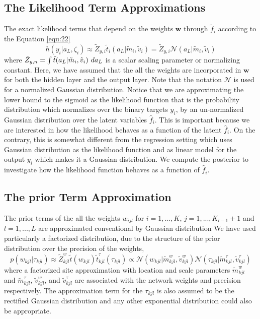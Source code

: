 \documentclass[]{article}
\begin{document}
\subsection*{The Likelihood Term Approximations}
The exact likelihood terms that depend on the weights $\mathbf{w}$ through $\tilde{f}_i$ according to the Equation \ref{equ:22}
\begin{equation}
	h(y_i|a_L,\zeta_i)\approx \tilde{Z}_{y,i} \tilde{t}_i(a_L|\tilde{m}_i,\tilde{v}_i) = \tilde{Z}_{y,i}\mathcal{N}(a_L|\tilde{m}_i, \tilde{v}_i) %
	\label{equ:23}
\end{equation}
where $\tilde{Z}_{y,n} = \int \tilde{t}(a_L|\tilde{m}_i,\tilde{v}_i) \hspace{0.05in}da_L$ is a scalar scaling parameter or normalizing constant. Here, we have assumed that the all the weights are incorporated in $\mathbf{w}$ for both the hidden layer and the output layer. Note that the notation $\mathcal{N}$ is used for a normalized Gaussian distribution. Notice that we are approximating the lower bound to the sigmoid as the likelihood function that is the probability distribution which normalizes over the binary targets $y_i$, by an un-normalized Gaussian distribution over the latent variables $\hat{f}_i$. This is important because we are interested in how the likelihood behaves as a function of the latent $\hat{f}_i$. On the contrary, this is somewhat different from the regression setting which uses Gaussian distribution as the likelihood function and as linear model for the output $y_i$ which makes it a Gaussian distribution. We compute the posterior to investigate how the likelihood function behaves as a function of $\hat{f}_i$.
\subsection*{The prior Term Approximation}
The prior terms of the all the weights $w_{ijl}$ for $i = 1,...,K$, $j = 1,...,K_{l-1} + 1$ and $l = 1,...,L$ are approximated conventional by Gaussian distribution
We have used particularly a factorized distribution, due to the structure of the prior distribution over the precision of the weights, 
\begin{equation}
	p(w_{kjl}|\tau_{kjl}) \approx \tilde{Z}_{kjl}^w\tilde{t}(w_{kjl})\tilde{t}^{\tau}_{kjl}(\tau_{kjl}) \propto \mathcal{N}(w_{kjl}|\tilde{m}^w_{kjl},\tilde{v}^w_{kjl})\mathcal{N}(\tau_{kjl}|\tilde{m}^\tau_{kjl},\tilde{v}^\tau_{kjl})
	\label{equ:24}
\end{equation}
where a factorized site approximation with location and scale parameters $\tilde{m}_{kjl}^{w}$ and $\tilde{m}^{\tau}_{kjl}$, $\tilde{v}^{w}_{kjl}$, and $\tilde{v}^{\tau}_{kjl}$ are associated with the network weights and precision respectively. The approximation term for the $\tau_{kjl}$ is also assumed to be the rectified Gaussian distribution and any other exponential distribution could also be appropriate. 
\end{document}
